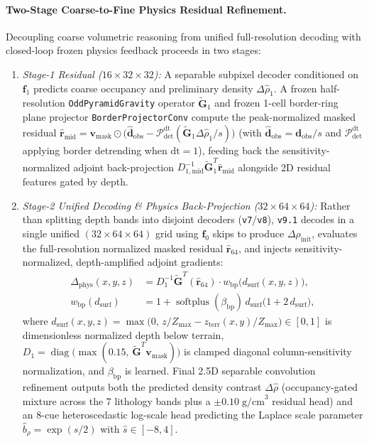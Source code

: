 \documentclass[11pt,a4paper]{article}
\begin{document}
\paragraph{Two-Stage Coarse-to-Fine Physics Residual Refinement.}
Decoupling coarse volumetric reasoning from unified full-resolution decoding with closed-loop frozen physics feedback proceeds in two stages:
\begin{enumerate}[leftmargin=1.4em,itemsep=0.25em]
  \item \emph{Stage-1 Residual ($16\times 32\times 32$):} A separable subpixel decoder conditioned on $\mathbf{f}_1$ predicts coarse occupancy and preliminary density $\Delta\hat{\rho}_1$. A frozen half-resolution \texttt{OddPyramidGravity} operator $\tilde{\mathbf{G}}_1$ and frozen 1-cell border-ring plane projector \texttt{BorderProjectorConv} compute the peak-normalized masked residual $\hat{\mathbf{r}}_{\mathrm{mid}} = \mathbf{v}_{\mathrm{mask}}\odot\bigl(\hat{\mathbf{d}}_{\mathrm{obs}} - \mathcal{P}_{\mathrm{det}}^{\mathrm{dt}}(\tilde{\mathbf{G}}_1\Delta\hat{\rho}_1 / s)\bigr)$ (with $\hat{\mathbf{d}}_{\mathrm{obs}} = \mathbf{d}_{\mathrm{obs}}/s$ and $\mathcal{P}_{\mathrm{det}}^{\mathrm{dt}}$ applying border detrending when $\text{dt}=1$), feeding back the sensitivity-normalized adjoint back-projection $D_{1,\mathrm{mid}}^{-1}\tilde{\mathbf{G}}_1^T \hat{\mathbf{r}}_{\mathrm{mid}}$ alongside 2D residual features gated by depth.
  \item \emph{Stage-2 Unified Decoding \& Physics Back-Projection ($32\times 64\times 64$):} Rather than splitting depth bands into disjoint decoders (\texttt{v7}/\texttt{v8}), \texttt{v9.1} decodes in a single unified $(32\times 64\times 64)$ grid using $\mathbf{f}_0$ skips to produce $\Delta\rho_{\mathrm{init}}$, evaluates the full-resolution normalized masked residual $\hat{\mathbf{r}}_{64}$, and injects sensitivity-normalized, depth-amplified adjoint gradients:
  \begin{equation}
  \begin{aligned}
    \Delta_{\mathrm{phys}}(x,y,z) &= D_1^{-1}\tilde{\mathbf{G}}^T(\hat{\mathbf{r}}_{64}) \cdot w_{\mathrm{bp}}\bigl(d_{\mathrm{surf}}(x,y,z)\bigr), \\
    w_{\mathrm{bp}}(d_{\mathrm{surf}}) &= 1 + \operatorname{softplus}(\beta_{\mathrm{bp}})\,d_{\mathrm{surf}}\bigl(1 + 2\,d_{\mathrm{surf}}\bigr),
  \end{aligned}
    \label{eq:bp_weight}
  \end{equation}
  where $d_{\mathrm{surf}}(x,y,z) = \max\bigl(0,\, z/Z_{\max} - z_{\mathrm{terr}}(x,y)/Z_{\max}\bigr) \in [0,1]$ is dimensionless normalized depth below terrain, $D_1 = \operatorname{diag}\!\bigl(\max(0.15,\, \tilde{\mathbf{G}}^T\mathbf{v}_{\mathrm{mask}})\bigr)$ is clamped diagonal column-sensitivity normalization, and $\beta_{\mathrm{bp}}$ is learned. Final 2.5D separable convolution refinement outputs both the predicted density contrast $\Delta\hat{\rho}$ (occupancy-gated mixture across the 7 lithology bands plus a $\pm 0.10\;\text{g/cm}^3$ residual head) and an 8-cue heteroscedastic log-scale head predicting the Laplace scale parameter $\hat{b}_\rho = \exp(\hat{s}/2)$ with $\hat{s} \in [-8, 4]$.
\end{enumerate}
\end{document}
